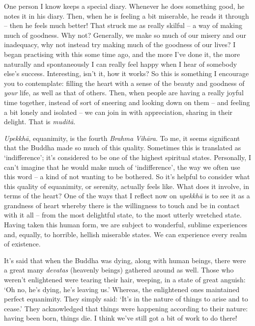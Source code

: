 One person I know keeps a special diary. Whenever he does something good, he notes it in his diary. Then, when he is feeling a bit miserable, he reads it through -- then he feels much better! That struck me as really skilful -- a way of making much of goodness. Why not? Generally, we make so much of our misery and our inadequacy, why not instead try making much of the goodness of our lives? I began practising with this some time ago, and the more I've done it, the more naturally and spontaneously I can really feel happy when I hear of somebody else's success. Interesting, isn't it, how it works? So this is something I encourage you to contemplate: filling the heart with a sense of the beauty and goodness of \textit{your} life, as well as that of others. Then, when people are having a really joyful time together, instead of sort of sneering and looking down on them -- and feeling a bit lonely and isolated -- we can join in with appreciation, sharing in their delight. That is \textit{mudit\=a}.

\textit{Upekkh\=a}, equanimity, is the fourth \textit{Brahma Vih\=ara}. To me, it seems significant that the Buddha made so much of this quality. Sometimes this is translated as `indifference'; it's considered to be one of the highest spiritual states. Personally, I can't imagine that he would make much of `indifference', the way we often use this word -- a kind of not wanting to be bothered. So it's helpful to consider what this quality of equanimity, or serenity, actually feels like. What does it involve, in terms of the heart? One of the ways that I reflect now on \textit{upekkh\=a} is to see it as a grandness of heart whereby there is the willingness to touch and be in contact with it all -- from the most delightful state, to the most utterly wretched state. Having taken this human form, we are subject to wonderful, sublime experiences and, equally, to horrible, hellish miserable states. We can experience every realm of existence.

It's said that when the Buddha was dying, along with human beings, there were a great many \textit{devatas} (heavenly beings) gathered around as well. Those who weren't enlightened were tearing their hair, weeping, in a state of great anguish: `Oh no, he's dying, he's leaving us.' Whereas, the enlightened ones maintained perfect equanimity. They simply said: `It's in the nature of things to arise and to cease.' They acknowledged that things were happening according to their nature: having been born, things die. I think we've still got a bit of work to do there!

